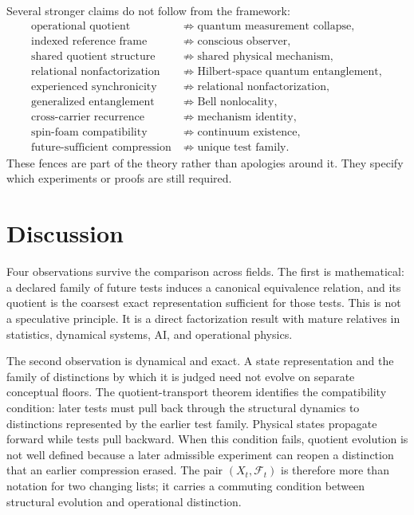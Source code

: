 \documentclass[11pt]{article}
\newcommand{\F}{\mathcal F}
\begin{document}
Several stronger claims do not follow from the framework:
\begin{equation}
\begin{aligned}
\text{operational quotient} &\not\Rightarrow \text{quantum measurement collapse},\\
\text{indexed reference frame} &\not\Rightarrow \text{conscious observer},\\
\text{shared quotient structure} &\not\Rightarrow \text{shared physical mechanism},\\
\text{relational nonfactorization} &\not\Rightarrow \text{Hilbert-space quantum entanglement},\\
\text{experienced synchronicity} &\not\Rightarrow \text{relational nonfactorization},\\
\text{generalized entanglement} &\not\Rightarrow \text{Bell nonlocality},\\
\text{cross-carrier recurrence} &\not\Rightarrow \text{mechanism identity},\\
\text{spin-foam compatibility} &\not\Rightarrow \text{continuum existence},\\
\text{future-sufficient compression} &\not\Rightarrow \text{unique test family}.
\end{aligned}
\label{eq:nonentailments}
\end{equation}
These fences are part of the theory rather than apologies around it. They specify which experiments or proofs are still required.

\section{Discussion}

Four observations survive the comparison across fields. The first is mathematical: a declared family of future tests induces a canonical equivalence relation, and its quotient is the coarsest exact representation sufficient for those tests. This is not a speculative principle. It is a direct factorization result with mature relatives in statistics, dynamical systems, AI, and operational physics.

The second observation is dynamical and exact. A state representation and the family of distinctions by which it is judged need not evolve on separate conceptual floors. The quotient-transport theorem identifies the compatibility condition: later tests must pull back through the structural dynamics to distinctions represented by the earlier test family. Physical states propagate forward while tests pull backward. When this condition fails, quotient evolution is not well defined because a later admissible experiment can reopen a distinction that an earlier compression erased. The pair $(X_t,\F_t)$ is therefore more than notation for two changing lists; it carries a commuting condition between structural evolution and operational distinction.
\end{document}
